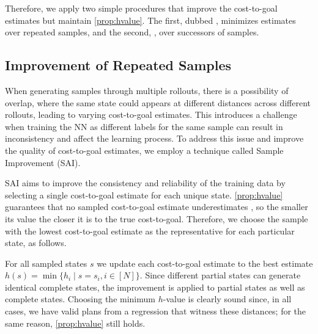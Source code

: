Therefore, we apply two simple procedures that improve the cost-to-goal estimates but maintain \cref{prop:hvalue}. The first, dubbed \hmin, minimizes estimates over repeated samples, and the second, \hvfc, over successors of samples.

\subsection{Improvement of Repeated Samples}
\label{sec:hmin} 

When generating samples through multiple rollouts, there is a possibility of overlap, where the same state could appears at different distances across different rollouts, leading to varying cost-to-goal estimates. This introduces a challenge when training the NN as different labels for the same sample can result in inconsistency and affect the learning process. To address this issue and improve the quality of cost-to-goal estimates, we employ a technique called Sample Improvement (SAI).

SAI aims to improve the consistency and reliability of the training data by selecting a single cost-to-goal estimate for each unique state. \cref{prop:hvalue} guarantees that no sampled cost-to-goal estimate underestimates \hstar, so the smaller its value the closer it is to the true cost-to-goal. Therefore, we choose the sample with the lowest cost-to-goal estimate as the representative for each particular state, as follows.

For all sampled states $s$ we update each cost-to-goal estimate to the best estimate $h(s) = \min\{h_i \mid s=s_i, i\in[N]\}$. Since different partial states can generate identical complete states, the improvement is applied to partial states as well as complete states. Choosing the minimum $h$-value is clearly sound since, in all cases, we have valid plans from a regression that witness these distances; for the same reason, \cref{prop:hvalue} still holds.

